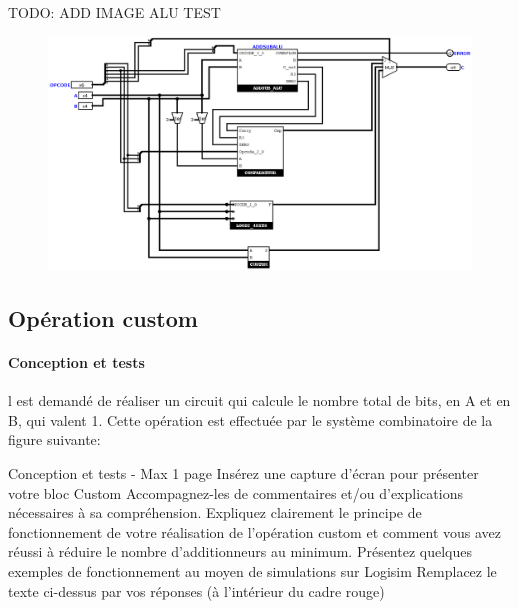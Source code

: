 \documentclass[a4paper]{article}
\begin{document}
\begin{tcolorbox}[colframe=Monokaimagenta,colback=white]
TODO: ADD IMAGE ALU TEST


\begin{figure}[H]
    \centering
    \includegraphics[width=\textwidth]{src/ALU.png}
    \label{fig:OVERFADDSUB_4BITS}
\end{figure}


\end{tcolorbox}

\subsection{Opération custom}
\label{custom}

\paragraph{Conception et tests}
l est demandé de réaliser un circuit qui calcule le nombre total de bits, en A et en B, qui valent 1. Cette opération est effectuée par le système combinatoire de la figure suivante:

\begin{tcolorbox}[colframe=Monokaimagenta,colback=white]
Conception et tests -  Max 1 page 
Insérez une capture d’écran pour présenter votre bloc Custom
Accompagnez-les de commentaires et/ou d’explications nécessaires à sa compréhension.
Expliquez clairement le principe de fonctionnement de votre réalisation de l’opération custom et comment vous avez réussi à réduire le nombre d’additionneurs au minimum.
Présentez quelques exemples de fonctionnement au moyen de simulations sur Logisim
Remplacez le texte ci-dessus par vos réponses (à l’intérieur du cadre rouge)




\end{tcolorbox}
\end{document}
